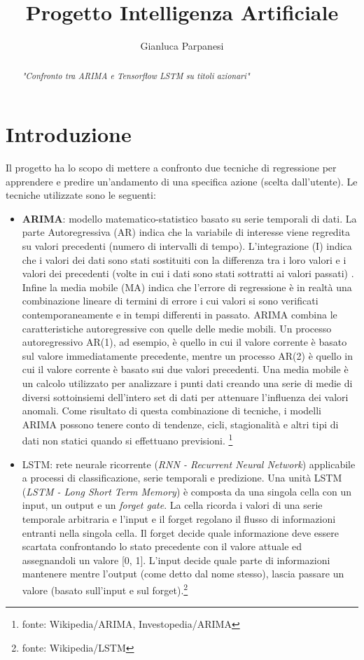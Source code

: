 \documentclass[a4paper,12pt]{article}
\title{Progetto Intelligenza Artificiale}
\author{Gianluca Parpanesi}
\begin{document}
    \maketitle
    \begin{abstract}
        \textit{"Confronto tra ARIMA e Tensorflow LSTM su titoli azionari"}
    \end{abstract}
    \newpage
    \section*{Introduzione}Il progetto ha lo scopo di mettere a confronto due 
    tecniche di regressione per apprendere e predire un'andamento di una 
    specifica azione (scelta dall'utente).
    Le tecniche utilizzate sono le seguenti:
    \begin{itemize}
        \item \textbf{ARIMA}: modello matematico-statistico basato su serie 
        temporali di dati. La parte Autoregressiva (AR) indica che la variabile
        di interesse viene regredita su valori precedenti (numero di intervalli
        di tempo). L'integrazione (I) indica che i valori dei dati sono stati 
        sostituiti con la differenza tra i loro valori e i valori dei 
        precedenti (volte in cui i dati sono stati sottratti ai valori passati)
        . Infine la media mobile (MA) indica che l'errore di regressione è in 
        realtà una combinazione lineare di termini di errore i cui valori si 
        sono verificati contemporaneamente e in tempi differenti in passato.
        ARIMA combina le caratteristiche autoregressive con quelle delle medie 
        mobili. Un processo autoregressivo AR(1), ad esempio, è quello in cui il 
        valore corrente è basato sul valore immediatamente precedente, 
        mentre un processo AR(2) è quello in cui il valore corrente è basato 
        sui due valori precedenti. Una media mobile è un calcolo utilizzato per
        analizzare i punti dati creando una serie di medie di diversi 
        sottoinsiemi dell'intero set di dati per attenuare l'influenza dei 
        valori anomali. Come risultato di questa combinazione di tecniche, i 
        modelli ARIMA possono tenere conto di tendenze, cicli, stagionalità e 
        altri tipi di dati non statici quando si effettuano previsioni.
        \footnote[1]{fonte: Wikipedia/ARIMA, Investopedia/ARIMA}
        \item LSTM: rete neurale ricorrente (\textit{RNN - Recurrent Neural 
        Network}) applicabile a processi di classificazione, serie temporali e 
        predizione. Una unità LSTM (\textit{LSTM - Long Short Term Memory}) è 
        composta da una singola cella con un input, un output e un 
        \textit{forget gate}. La cella ricorda i valori di una serie temporale 
        arbitraria e l'input e il forget regolano il flusso di informazioni 
        entranti nella singola cella. Il forget decide quale informazione deve 
        essere scartata confrontando lo stato precedente con il valore attuale 
        ed assegnandoli un valore [0, 1]. L'input decide quale parte di 
        informazioni mantenere mentre l'output (come detto dal nome stesso), 
        lascia passare un valore (basato sull'input e sul 
        forget).\footnote[2]{fonte: Wikipedia/LSTM}


\end{itemize}
\end{document}

